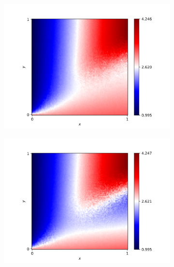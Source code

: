 \begin{frame}{}
    \begin{figure}
    \centering
        \begin{subfigure}{.5\textwidth}
          \centering
          \includegraphics[width=\linewidth]{images/grasr-fortran.png}
        \end{subfigure}%
        \begin{subfigure}{.5\textwidth}
          \centering
          \includegraphics[width=\linewidth]{images/grasr-python.png}
        \end{subfigure}
    \end{figure}
\end{frame}
